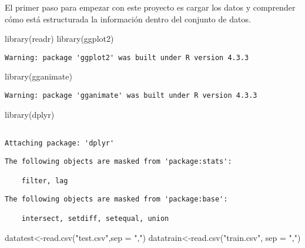 \documentclass[
  letterpaper,
  DIV=11,
  numbers=noendperiod]{scrreprt}
\newenvironment{Shaded}{\begin{snugshade}}{\end{snugshade}}
\newcommand{\AttributeTok}[1]{\textcolor[rgb]{0.40,0.45,0.13}{#1}}
\newcommand{\FunctionTok}[1]{\textcolor[rgb]{0.28,0.35,0.67}{#1}}
\newcommand{\NormalTok}[1]{\textcolor[rgb]{0.00,0.23,0.31}{#1}}
\newcommand{\OtherTok}[1]{\textcolor[rgb]{0.00,0.23,0.31}{#1}}
\newcommand{\StringTok}[1]{\textcolor[rgb]{0.13,0.47,0.30}{#1}}
\begin{document}
El primer paso para empezar con este proyecto es cargar los datos y
comprender cómo está estructurada la información dentro del conjunto de
datos.

\begin{Shaded}
\begin{Highlighting}[]
\FunctionTok{library}\NormalTok{(readr)}
\FunctionTok{library}\NormalTok{(ggplot2)}
\end{Highlighting}
\end{Shaded}

\begin{verbatim}
Warning: package 'ggplot2' was built under R version 4.3.3
\end{verbatim}

\begin{Shaded}
\begin{Highlighting}[]
\FunctionTok{library}\NormalTok{(gganimate)}
\end{Highlighting}
\end{Shaded}

\begin{verbatim}
Warning: package 'gganimate' was built under R version 4.3.3
\end{verbatim}

\begin{Shaded}
\begin{Highlighting}[]
\FunctionTok{library}\NormalTok{(dplyr)}
\end{Highlighting}
\end{Shaded}

\begin{verbatim}

Attaching package: 'dplyr'
\end{verbatim}

\begin{verbatim}
The following objects are masked from 'package:stats':

    filter, lag
\end{verbatim}

\begin{verbatim}
The following objects are masked from 'package:base':

    intersect, setdiff, setequal, union
\end{verbatim}

\begin{Shaded}
\begin{Highlighting}[]
\NormalTok{datatest}\OtherTok{\textless{}{-}}\FunctionTok{read.csv}\NormalTok{(}\StringTok{"test.csv"}\NormalTok{,}\AttributeTok{sep =} \StringTok{","}\NormalTok{)}
\NormalTok{datatrain}\OtherTok{\textless{}{-}}\FunctionTok{read.csv}\NormalTok{(}\StringTok{"train.csv"}\NormalTok{, }\AttributeTok{sep =} \StringTok{","}\NormalTok{)}
\end{Highlighting}
\end{Shaded}
\end{document}
